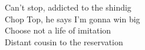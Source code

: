 Can't stop, addicted to the shindig \\
Chop Top, he says I'm gonna win big \\
Choose not a life of imitation \\
Distant cousin to the reservation \\

